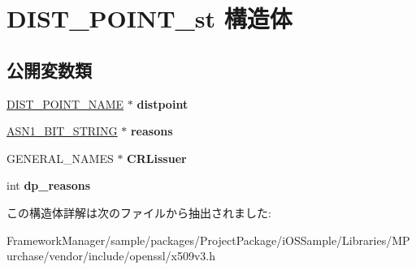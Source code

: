 \hypertarget{struct_d_i_s_t___p_o_i_n_t__st}{}\section{D\+I\+S\+T\+\_\+\+P\+O\+I\+N\+T\+\_\+st 構造体}
\label{struct_d_i_s_t___p_o_i_n_t__st}
\subsection*{公開変数類}
\begin{DoxyCompactItemize}
\item 
\hypertarget{struct_d_i_s_t___p_o_i_n_t__st_a8c519036ea9d52503225c5417b6239b8}{}\hyperlink{struct_d_i_s_t___p_o_i_n_t___n_a_m_e__st}{D\+I\+S\+T\+\_\+\+P\+O\+I\+N\+T\+\_\+\+N\+A\+M\+E} $\ast$ {\bfseries distpoint}\label{struct_d_i_s_t___p_o_i_n_t__st_a8c519036ea9d52503225c5417b6239b8}

\item 
\hypertarget{struct_d_i_s_t___p_o_i_n_t__st_adadc29440678f7d0df1f8fb9319ba87c}{}\hyperlink{structasn1__string__st}{A\+S\+N1\+\_\+\+B\+I\+T\+\_\+\+S\+T\+R\+I\+N\+G} $\ast$ {\bfseries reasons}\label{struct_d_i_s_t___p_o_i_n_t__st_adadc29440678f7d0df1f8fb9319ba87c}

\item 
\hypertarget{struct_d_i_s_t___p_o_i_n_t__st_a9dd08da439a604af4d6bc6cf68acf4f6}{}G\+E\+N\+E\+R\+A\+L\+\_\+\+N\+A\+M\+E\+S $\ast$ {\bfseries C\+R\+Lissuer}\label{struct_d_i_s_t___p_o_i_n_t__st_a9dd08da439a604af4d6bc6cf68acf4f6}

\item 
\hypertarget{struct_d_i_s_t___p_o_i_n_t__st_a4f2ea5592417459b8d97a97515380a75}{}int {\bfseries dp\+\_\+reasons}\label{struct_d_i_s_t___p_o_i_n_t__st_a4f2ea5592417459b8d97a97515380a75}

\end{DoxyCompactItemize}


この構造体詳解は次のファイルから抽出されました\+:\begin{DoxyCompactItemize}
\item 
Framework\+Manager/sample/packages/\+Project\+Package/i\+O\+S\+Sample/\+Libraries/\+M\+Purchase/vendor/include/openssl/x509v3.\+h\end{DoxyCompactItemize}
